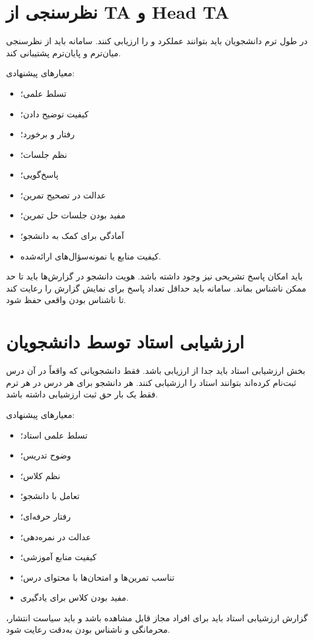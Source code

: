 \documentclass[12pt,a4paper]{article}
\begin{document}
\section{نظرسنجی از TA و Head TA}
در طول ترم دانشجویان باید بتوانند عملکرد  و  را ارزیابی کنند. سامانه باید از نظرسنجی میان‌ترم و پایان‌ترم پشتیبانی کند.

معیارهای پیشنهادی:
\begin{itemize}
\item تسلط علمی؛
\item کیفیت توضیح دادن؛
\item رفتار و برخورد؛
\item نظم جلسات؛
\item پاسخ‌گویی؛
\item عدالت در تصحیح تمرین؛
\item مفید بودن جلسات حل تمرین؛
\item آمادگی برای کمک به دانشجو؛
\item کیفیت منابع یا نمونه‌سؤال‌های ارائه‌شده.
\end{itemize}

باید امکان پاسخ تشریحی نیز وجود داشته باشد. هویت دانشجو در گزارش‌ها باید تا حد ممکن ناشناس بماند. سامانه باید حداقل تعداد پاسخ برای نمایش گزارش را رعایت کند تا ناشناس بودن واقعی حفظ شود.

\section{ارزشیابی استاد توسط دانشجویان}
بخش ارزشیابی استاد باید جدا از ارزیابی  باشد. فقط دانشجویانی که واقعاً در آن درس ثبت‌نام کرده‌اند بتوانند استاد را ارزشیابی کنند. هر دانشجو برای هر درس در هر ترم فقط یک بار حق ثبت ارزشیابی داشته باشد.

معیارهای پیشنهادی:
\begin{itemize}
\item تسلط علمی استاد؛
\item وضوح تدریس؛
\item نظم کلاس؛
\item تعامل با دانشجو؛
\item رفتار حرفه‌ای؛
\item عدالت در نمره‌دهی؛
\item کیفیت منابع آموزشی؛
\item تناسب تمرین‌ها و امتحان‌ها با محتوای درس؛
\item مفید بودن کلاس برای یادگیری.
\end{itemize}

گزارش ارزشیابی استاد باید برای افراد مجاز قابل مشاهده باشد و باید سیاست انتشار، محرمانگی و ناشناس بودن به‌دقت رعایت شود.
\end{document}

